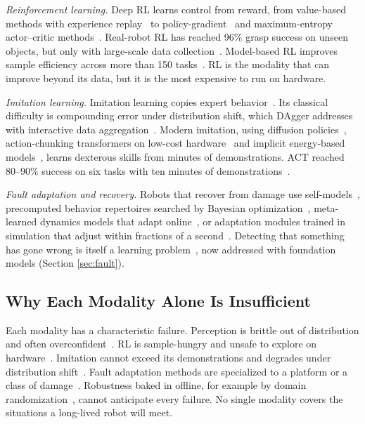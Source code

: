\documentclass[journal]{IEEEtran}
\begin{document}
\textit{Reinforcement learning.} Deep RL learns control from reward, from value-based methods with experience replay~\cite{Mnih2015} to policy-gradient~\cite{Schulman2017} and maximum-entropy actor--critic methods~\cite{Haarnoja2018,Fujimoto2018}. Real-robot RL has reached 96\% grasp success on unseen objects, but only with large-scale data collection~\cite{Kalashnikov2018}. Model-based RL improves sample efficiency across more than 150 tasks~\cite{Hafner2023}. RL is the modality that can improve beyond its data, but it is the most expensive to run on hardware.

\textit{Imitation learning.} Imitation learning copies expert behavior~\cite{Osa2018}. Its classical difficulty is compounding error under distribution shift, which DAgger addresses with interactive data aggregation~\cite{Ross2011}. Modern imitation, using diffusion policies~\cite{Chi2023}, action-chunking transformers on low-cost hardware~\cite{Zhao2023} and implicit energy-based models~\cite{Florence2021}, learns dexterous skills from minutes of demonstrations. ACT reached 80--90\% success on six tasks with ten minutes of demonstrations~\cite{Zhao2023}.

\textit{Fault adaptation and recovery.} Robots that recover from damage use self-models~\cite{Bongard2006}, precomputed behavior repertoires searched by Bayesian optimization~\cite{Cully2015}, meta-learned dynamics models that adapt online~\cite{Nagabandi2019}, or adaptation modules trained in simulation that adjust within fractions of a second~\cite{Kumar2021}. Detecting that something has gone wrong is itself a learning problem~\cite{Pang2021,Khalastchi2018}, now addressed with foundation models (Section \ref{sec:fault}).


\subsection{Why Each Modality Alone Is Insufficient}\label{sec:insufficient}
Each modality has a characteristic failure. Perception is brittle out of distribution and often overconfident~\cite{Guo2017,Hendrycks2017}. RL is sample-hungry and unsafe to explore on hardware~\cite{Brunke2022}. Imitation cannot exceed its demonstrations and degrades under distribution shift~\cite{Ross2011}. Fault adaptation methods are specialized to a platform or a class of damage~\cite{Kumar2021}. Robustness baked in offline, for example by domain randomization~\cite{Tobin2017}, cannot anticipate every failure. No single modality covers the situations a long-lived robot will meet.
\end{document}
